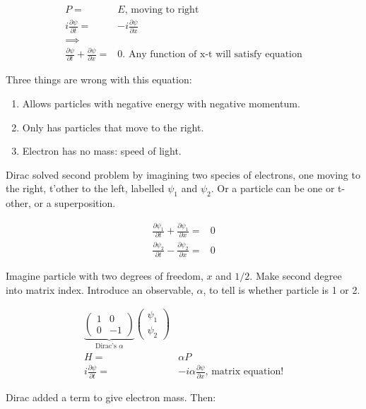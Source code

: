 \documentclass[]{article}
\begin{document}
\begin{align*}
P =& E \text{, moving to right}\\
i \frac{\partial \psi}{\partial t} =& -i \frac{\partial \psi}{\partial x}\\
\implies&\\
\frac{\partial \psi}{\partial t} + \frac{\partial \psi}{\partial x}=&0\text{. Any function of x-t will satisfy equation}
\end{align*}

Three things are wrong with this equation:
\begin{enumerate}
	\item Allows particles with negative energy with negative momentum.
	\item Only has particles that move to the right.
	\item Electron has no mass: speed of light.
\end{enumerate}

Dirac solved second problem by imagining two species of electrons, one moving to the right, t'other to the left, labelled $\psi_1$ and $\psi_2$. Or a particle can be one or t-other, or a superposition.

\begin{align*}
\frac{\partial \psi_1}{\partial t} + \frac{\partial \psi_1}{\partial x}=&0\\
\frac{\partial \psi_2}{\partial t} - \frac{\partial \psi_2}{\partial x}=&0
\end{align*}

Imagine particle with two degrees of freedom, $x$ and $1/2$. Make second degree into matrix index. Introduce an observable, $\alpha$, to tell is whether particle is 1 or 2.

\begin{align*}
\underbrace{
	\begin{pmatrix}
		1 & 0\\
		0 & -1
	\end{pmatrix}
}_\text{Dirac's $\alpha$}
\begin{pmatrix}
	\psi_1\\
	\psi_2
\end{pmatrix}\\
H =& \alpha P\\
i\frac{\partial \psi}{\partial t} =& -i \alpha \frac{\partial \psi}{\partial x} \text{, matrix equation!}
\end{align*}

Dirac added a term to give electron mass. Then:
\end{document}

